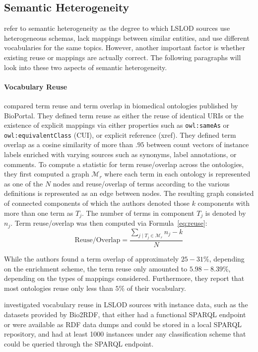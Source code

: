 \documentclass[runningheads]{llncs}
\begin{document}
    \subsection{Semantic Heterogeneity}
    \citet{kamdar2021empirical} refer to semantic heterogeneity as the degree to which LSLOD sources use heterogeneous schemas, lack mappings between similar entities, and use different vocabularies for the same topics.
    However, another important factor is whether existing reuse or mappings are actually correct.
    The following paragraphs will look into these two aspects of semantic heterogeneity.

    \paragraph{Vocabulary Reuse}
    \citet{kamdar2017systematic} compared term reuse and term overlap in biomedical ontologies published by BioPortal.
    They defined term reuse as either the reuse of identical URIs or the existence of explicit mappings via either properties such as \texttt{owl:sameAs} or \texttt{owl:equivalentClass} (CUI), or explicit reference (xref).
    They defined term overlap as a cosine similarity of more than $.95$ between count vectors of instance labels enriched with varying sources such as synonyms, label annotations, or comments.
    To compute a statistic for term reuse/overlap across the ontologies, they first computed a graph $\mathscr{M}_{r}$ where each term in each ontology is represented as one of the $N$ nodes and reuse/overlap of terms according to the various definitions is represented as an edge between nodes.
    The resulting graph consisted of connected components of which the authors denoted those $k$ components with more than one term as $T_j$.
    The number of terms in component $T_j$ is denoted by $n_j$.
    Term reuse/overlap was then computed via Formula~\ref{eq:reuse}:
    \begin{equation}\label{eq:reuse}
        \text{Reuse/Overlap}=\frac{\sum_{j \mid T_{j} \in \mathscr{M}_{r}} n_{j}-k}{N}
    \end{equation}

    While the authors found a term overlap of approximately $25 - 31\%$, depending on the enrichment scheme, the term reuse only amounted to $5.98 - 8.39\%$, depending on the types of mappings considered.
    Furthermore, they report that most ontologies reuse only less than $5\%$ of their vocabulary.

    \citet{kamdar2021empirical} investigated vocabulary reuse in LSLOD sources with instance data, such as the datasets provided by Bio2RDF, that either had a functional SPARQL endpoint or were available as RDF data dumps and could be stored in a local SPARQL repository, and had at least 1000 instances under any classification scheme that could be queried through the SPARQL endpoint.
\end{document}
